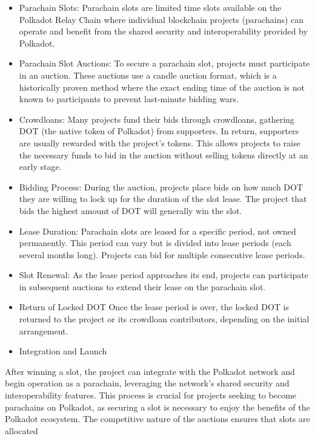 \documentclass{tufte-handout}
\begin{document}
\begin{itemize}
\item Parachain Slots:
Parachain slots are limited time slots available on the Polkadot Relay Chain where individual blockchain projects (parachains) can operate
and benefit from the shared security and interoperability provided by Polkadot.
\item Parachain Slot Auctions:
To secure a parachain slot, projects must participate in an auction. These auctions use a candle auction format, which is a historically
proven method where the exact ending time of the auction is not known to participants to prevent last-minute bidding wars.
\item Crowdloans:
Many projects fund their bids through crowdloans, gathering DOT (the native token of Polkadot) from supporters. In return, supporters are
usually rewarded with the project's tokens. This allows projects to raise the necessary funds to bid in the auction without selling tokens
directly at an early stage.
\item Bidding Process:
During the auction, projects place bids on how much DOT they are willing to lock up for the duration of the slot lease. The project that
bids the highest amount of DOT will generally win the slot.
\item Lease Duration:
Parachain slots are leased for a specific period, not owned permanently. This period can vary but is divided into lease periods (each
several months long). Projects can bid for multiple consecutive lease periods.
\item Slot Renewal:
As the lease period approaches its end, projects can participate in subsequent auctions to extend their lease on the parachain slot.
\item Return of Locked DOT
Once the lease period is over, the locked DOT is returned to the project or its crowdloan contributors, depending on the initial arrangement.
\item Integration and Launch
\end{itemize}
After winning a slot, the project can integrate with the Polkadot network and begin operation as a parachain, leveraging the network's
shared security and interoperability features. This process is crucial for projects seeking to become parachains on Polkadot, as securing a
slot is necessary to enjoy the benefits of the Polkadot ecosystem. The competitive nature of the auctions ensures that slots are allocated
\end{document}
